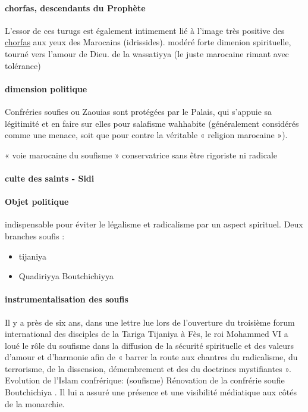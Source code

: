  \paragraph{chorfas, descendants du Prophète} L'essor de ces turugs est également intimement lié à l'image très positive des \href{https://fr.wikipedia.org/wiki/Ch%C3%A9rif}{chorfas} aux yeux des Marocains (idrissides).
 modéré forte dimenion spirituelle, tourné vers l'amour de Dieu.
de la wassatiyya (le juste
marocaine rimant avec tolérance)

\paragraph{dimension politique}
Confréries soufies ou
Zaouias sont
protégées par le Palais, qui s'appuie sa légitimité et en faire sur elles pour salafisme wahhabite (généralement considérés comme une menace, soit que  pour contre la  véritable « religion marocaine »). 


« voie marocaine du soufisme » conservatrice sans être rigoriste ni radicale

\paragraph{culte des saints - Sidi}

\paragraph{Objet politique} indispensable pour éviter le légalisme et radicalisme par un aspect spirituel.
Deux branches soufis : 
\begin{itemize}
    \item tijaniya
    \item Quadiriyya Boutchichiyya
\end{itemize}


\paragraph{instrumentalisation des soufis}

Il y a près de six ans, dans une lettre lue lors de l'ouverture du troisième forum international des disciples de la Tariga Tijaniya à Fès, le roi Mohammed VI a loué le rôle du soufisme dans la diffusion de la sécurité spirituelle et des valeurs d'amour et d'harmonie afin de « barrer la route aux chantres du radicalisme, du terrorisme, de la dissension, démembrement et des du doctrines mystifiantes ».
Evolution de l'Islam confrérique: (soufisme)   Rénovation de la confrérie soufie Boutchichiya .
Il lui a assuré une présence et une visibilité médiatique aux côtés de la monarchie.


